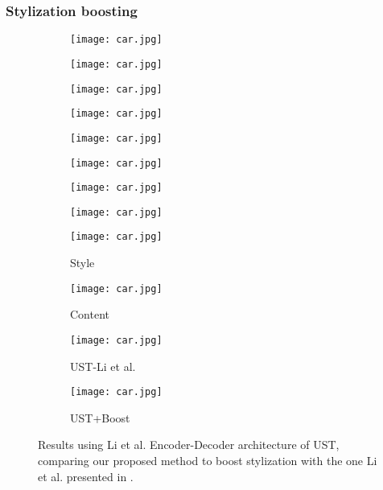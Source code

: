 \subsubsection{Stylization boosting}
\begin{figure}[H]
	\centering
	\begin{subfigure}[b]{0.225\linewidth}
		\texttt{[image: car.jpg]} %
	\end{subfigure}
	\begin{subfigure}[b]{0.225\linewidth}
		\texttt{[image: car.jpg]} %
	\end{subfigure}
	\begin{subfigure}[b]{0.225\linewidth}
		\texttt{[image: car.jpg]} %
	\end{subfigure}
	\begin{subfigure}[b]{0.225\linewidth}
		\texttt{[image: car.jpg]} %
	\end{subfigure}
	\centering
	\begin{subfigure}[b]{0.225\linewidth}
		\texttt{[image: car.jpg]} %
	\end{subfigure}
	\begin{subfigure}[b]{0.225\linewidth}
		\texttt{[image: car.jpg]} %
	\end{subfigure}
	\begin{subfigure}[b]{0.225\linewidth}
		\texttt{[image: car.jpg]} %
	\end{subfigure}
	\begin{subfigure}[b]{0.225\linewidth}
		\texttt{[image: car.jpg]} %
	\end{subfigure}
	\centering
	\begin{subfigure}[b]{0.225\linewidth}
		\texttt{[image: car.jpg]} %
		\caption{Style}
	\end{subfigure}
	\begin{subfigure}[b]{0.225\linewidth}
		\texttt{[image: car.jpg]} %
		\caption{Content}
	\end{subfigure}
	\begin{subfigure}[b]{0.225\linewidth}
		\texttt{[image: car.jpg]} %
		\caption{UST-Li et al. \cite{bib11}}
	\end{subfigure}
	\begin{subfigure}[b]{0.225\linewidth}
		\texttt{[image: car.jpg]} %
		\caption{UST+Boost}
	\end{subfigure}
	\caption{Results using Li et al. \cite{bib11} Encoder-Decoder architecture of UST, comparing our proposed method to boost stylization with the one Li et al. presented in \cite{bib11}.}
	\label{fig:Boost}
\end{figure}
